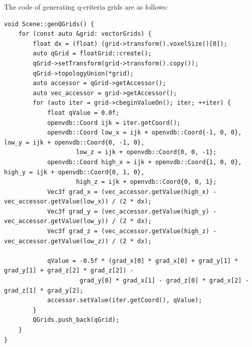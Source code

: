 \documentclass[acmtog]{acmart}
\begin{document}
    The code of generating q-criteria grids are as follows:
    \begin{lstlisting}[label={lst:lstlisting7}]
void Scene::genQGrids() {
    for (const auto &grid: vectorGrids) {
        float dx = (float) (grid->transform().voxelSize()[0]);
        auto qGrid = floatGrid::create();
        qGrid->setTransform(grid->transform().copy());
        qGrid->topologyUnion(*grid);
        auto accessor = qGrid->getAccessor();
        auto vec_accessor = grid->getAccessor();
        for (auto iter = grid->cbeginValueOn(); iter; ++iter) {
            float qValue = 0.0f;
            openvdb::Coord ijk = iter.getCoord();
            openvdb::Coord low_x = ijk + openvdb::Coord{-1, 0, 0}, low_y = ijk + openvdb::Coord{0, -1, 0},
                    low_z = ijk + openvdb::Coord{0, 0, -1};
            openvdb::Coord high_x = ijk + openvdb::Coord{1, 0, 0}, high_y = ijk + openvdb::Coord{0, 1, 0},
                    high_z = ijk + openvdb::Coord{0, 0, 1};
            Vec3f grad_x = (vec_accessor.getValue(high_x) - vec_accessor.getValue(low_x)) / (2 * dx);
            Vec3f grad_y = (vec_accessor.getValue(high_y) - vec_accessor.getValue(low_y)) / (2 * dx);
            Vec3f grad_z = (vec_accessor.getValue(high_z) - vec_accessor.getValue(low_z)) / (2 * dx);

            qValue = -0.5f * (grad_x[0] * grad_x[0] + grad_y[1] * grad_y[1] + grad_z[2] * grad_z[2]) -
                     grad_y[0] * grad_x[1] - grad_z[0] * grad_x[2] - grad_z[1] * grad_y[2];
            accessor.setValue(iter.getCoord(), qValue);
        }
        QGrids.push_back(qGrid);
    }
}
    \end{lstlisting}
\end{document}
